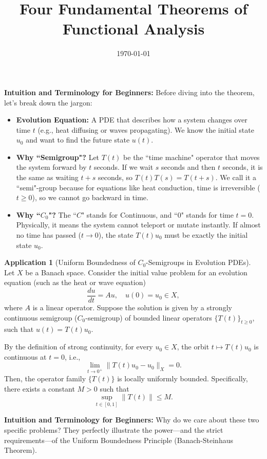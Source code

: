\documentclass[11pt,a4paper]{article}
\title{Four Fundamental Theorems of Functional Analysis}
\date{\today}
\theoremstyle{plain}
\theoremstyle{definition}
\newtheorem{application}{Application}[section]
\begin{document}
\maketitle




\textbf{Intuition and Terminology for Beginners:}
Before diving into the theorem, let's break down the jargon:
\begin{itemize}
    \item \textbf{Evolution Equation:} A PDE that describes how a system changes over time \(t\) (e.g., heat diffusing or waves propagating). We know the initial state \(u_0\) and want to find the future state \(u(t)\).
    \item \textbf{Why ``Semigroup"?} Let \(T(t)\) be the ``time machine" operator that moves the system forward by \(t\) seconds. If we wait \(s\) seconds and then \(t\) seconds, it is the same as waiting \(t+s\) seconds, so \(T(t)T(s) = T(t+s)\). We call it a ``semi"-group because for equations like heat conduction, time is irreversible (\(t \ge 0\)), so we cannot go backward in time.
    \item \textbf{Why ``\(C_0\)"?} The ``\(C\)" stands for Continuous, and ``\(0\)" stands for time \(t=0\). Physically, it means the system cannot teleport or mutate instantly. If almost no time has passed (\(t \to 0\)), the state \(T(t)u_0\) must be exactly the initial state \(u_0\).
\end{itemize}
\begin{application}[Uniform Boundedness of $C_0$-Semigroups in Evolution PDEs]
    Let \(X\) be a Banach space. Consider the initial value problem for an evolution equation (such as the heat or wave equation)
    \[
        \frac{du}{dt} = Au, \quad u(0) = u_0 \in X,
    \]
    where \(A\) is a linear operator. Suppose the solution is given by a strongly continuous semigroup (\(C_0\)-semigroup) of bounded linear operators \(\{T(t)\}_{t\ge 0}\), such that \(u(t) = T(t)u_0\).

    By the definition of strong continuity, for every \(u_0 \in X\), the orbit \(t \mapsto T(t)u_0\) is continuous at \(t=0\), i.e.,
    \[
        \lim_{t \to 0^+} \|T(t)u_0 - u_0\|_X = 0.
    \]
    Then, the operator family \(\{T(t)\}\) is locally uniformly bounded. Specifically, there exists a constant \(M > 0\) such that
    \[
        \sup_{t \in [0,1]} \|T(t)\| \le M.
    \]
\end{application}
\textbf{Intuition and Terminology for Beginners:}
Why do we care about these two specific problems? They perfectly illustrate the power---and the strict requirements---of the Uniform Boundedness Principle (Banach-Steinhaus Theorem).
\end{document}
